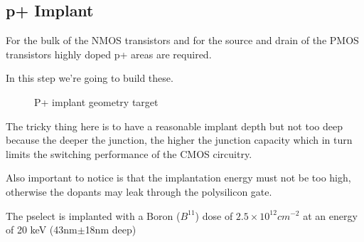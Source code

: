 \subsection{p+ Implant}\label{pimplant_chapter}

For the bulk of the NMOS transistors and for the source and drain of the PMOS transistors highly doped  p+ areas are required.

In this step we're going to build these.

\begin{figure}[H]
	\centering
	\begin{tikzpicture}[node distance = 3cm, auto, thick,scale=\CrossAndTopSectionBig, every node/.style={transform shape}]
		
	\end{tikzpicture}
	\caption{P+ implant geometry target}
\end{figure}

The tricky thing here is to have a reasonable implant depth but not too deep because the deeper the junction, the higher the junction capacity which in turn limits the switching performance of the CMOS circuitry.

Also important to notice is that the implantation energy must not be too high, otherwise the dopants may leak through the polysilicon gate.

The pselect is implanted with a Boron ($B^{11}$) dose of $2.5\times10^{12}cm^{-2}$ at an energy of 20 keV  (43nm$\pm$18nm deep)

